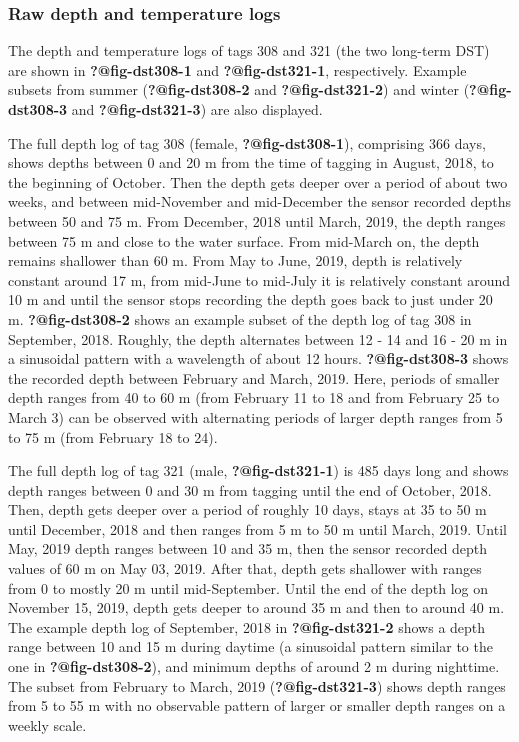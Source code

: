 \documentclass[
  authoryear,
  review,
  3p]{elsarticle}
\begin{document}
\hypertarget{raw-depth-and-temperature-logs}{%
\subsubsection{Raw depth and temperature
logs}\label{raw-depth-and-temperature-logs}}

The depth and temperature logs of tags 308 and 321 (the two long-term
DST) are shown in \textbf{?@fig-dst308-1} and \textbf{?@fig-dst321-1},
respectively. Example subsets from summer (\textbf{?@fig-dst308-2} and
\textbf{?@fig-dst321-2}) and winter (\textbf{?@fig-dst308-3} and
\textbf{?@fig-dst321-3}) are also displayed.

The full depth log of tag 308 (female, \textbf{?@fig-dst308-1}),
comprising 366 days, shows depths between 0 and 20 m from the time of
tagging in August, 2018, to the beginning of October. Then the depth
gets deeper over a period of about two weeks, and between mid-November
and mid-December the sensor recorded depths between 50 and 75 m. From
December, 2018 until March, 2019, the depth ranges between 75 m and
close to the water surface. From mid-March on, the depth remains
shallower than 60 m. From May to June, 2019, depth is relatively
constant around 17 m, from mid-June to mid-July it is relatively
constant around 10 m and until the sensor stops recording the depth goes
back to just under 20 m. \textbf{?@fig-dst308-2} shows an example subset
of the depth log of tag 308 in September, 2018. Roughly, the depth
alternates between 12 - 14 and 16 - 20 m in a sinusoidal pattern with a
wavelength of about 12 hours. \textbf{?@fig-dst308-3} shows the recorded
depth between February and March, 2019. Here, periods of smaller depth
ranges from 40 to 60 m (from February 11 to 18 and from February 25 to
March 3) can be observed with alternating periods of larger depth ranges
from 5 to 75 m (from February 18 to 24).

The full depth log of tag 321 (male, \textbf{?@fig-dst321-1}) is 485
days long and shows depth ranges between 0 and 30 m from tagging until
the end of October, 2018. Then, depth gets deeper over a period of
roughly 10 days, stays at 35 to 50 m until December, 2018 and then
ranges from 5 m to 50 m until March, 2019. Until May, 2019 depth ranges
between 10 and 35 m, then the sensor recorded depth values of 60 m on
May 03, 2019. After that, depth gets shallower with ranges from 0 to
mostly 20 m until mid-September. Until the end of the depth log on
November 15, 2019, depth gets deeper to around 35 m and then to around
40 m. The example depth log of September, 2018 in
\textbf{?@fig-dst321-2} shows a depth range between 10 and 15 m during
daytime (a sinusoidal pattern similar to the one in
\textbf{?@fig-dst308-2}), and minimum depths of around 2 m during
nighttime. The subset from February to March, 2019
(\textbf{?@fig-dst321-3}) shows depth ranges from 5 to 55 m with no
observable pattern of larger or smaller depth ranges on a weekly scale.
\end{document}
